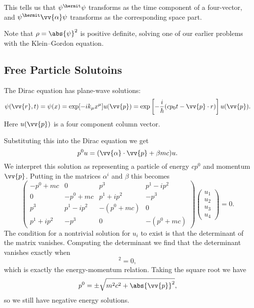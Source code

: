 This tells us that \(\psi^\hermit \psi\) transforms as the time component of a four-vector, and \(\psi^\hermit \vv{\alpha} \psi\) transforms as the corresponding space part.

Note that \(\rho = \abs{\psi}^2\) is positive definite, solving one of our earlier problems with the Klein--Gordon equation.

\subsection{Free Particle Solutoins}
The Dirac equation has plane-wave solutions:
\begin{equation}
    \psi(\vv{r}, t) = \psi(x) = \exp[-ik_\mu x^\mu]u(\vv{p}) = \exp\left[ -\frac{i}{\hbar}(cp_0t - \vv{p} \cdot r) \right]u(\vv{p}).
\end{equation}
Here \(u(\vv{p})\) is a four component column vector.

Substituting this into the Dirac equation we get
\begin{equation}
    p^0u = (\vv{\alpha} \cdot \vv{p} + \beta mc)u.
\end{equation}
We interpret this solution as representing a particle of energy \(cp^0\) and momentum \(\vv{p}\).
Putting in the matrices \(\alpha^i\) and \(\beta\) this becomes
\begin{equation}\label{eqn:dirac equation wave solution matrix form}
    \begin{pmatrix}
        -p^0 + mc & 0 & p^3 & p^1 - ip^2\\
        0 & -p^0 + mc & p^1 + ip^2 & -p^3\\
        p^3 & p^1 - ip^2 & -(p^0 + mc) & 0\\
        p^1 + ip^2 & -p^3 & 0 & -(p^0 + mc)
    \end{pmatrix}
    \begin{pmatrix}
        u_1\\ u_2\\ u_3\\ u_4
    \end{pmatrix}
    = 0.
\end{equation}
The condition for a nontrivial solution for \(u_i\) to exist is that the determinant of the matrix vanishes.
Computing the determinant we find that the determinant vanishes exactly when
\begin{equation}
    [m^2 c^2 + \abs{\vv{p}}^2 - (p^0)^2]^2 = 0,
\end{equation}
which is exactly the energy-momentum relation.
Taking the square root we have
\begin{equation}
    p^0 = \pm \sqrt{m^2c^2 + \abs{\vv{p}}^2},
\end{equation}
so we still have negative energy solutions.


